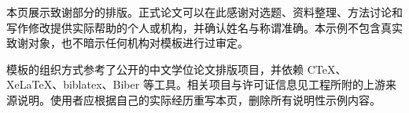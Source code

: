 本页展示致谢部分的排版。正式论文可以在此感谢对选题、资料整理、方法讨论和写作修改提供实际帮助的个人或机构，并确认姓名与称谓准确。本示例不包含真实致谢对象，也不暗示任何机构对模板进行过审定。

模板的组织方式参考了公开的中文学位论文排版项目，并依赖 CTeX、XeLaTeX、biblatex、Biber 等工具。相关项目与许可证信息见工程所附的上游来源说明。使用者应根据自己的实际经历重写本页，删除所有说明性示例内容。
